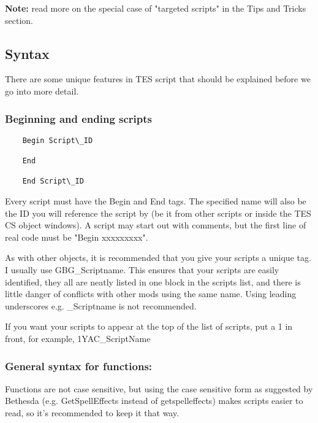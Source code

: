 \textbf{Note:} read more on the special case of "targeted scripts" in
the Tips and Tricks section.

\hypertarget{syntax}{%
\subsection{\texorpdfstring{\hfill\break
Syntax}{ Syntax}}\label{syntax}}

There are some unique features in TES script that should be explained
before we go into more detail.

\hypertarget{beginning-and-ending-scripts}{%
\subsubsection{Beginning and ending
scripts}\label{beginning-and-ending-scripts}}

\begin{lstlisting}
	Begin Script\_ID
	
	End
	
	End Script\_ID
\end{lstlisting}

Every script must have the Begin and End tags. The specified name will
also be the ID you will reference the script by (be it from other
scripts or inside the TES CS object windows). A script may start out
with comments, but the first line of real code must be "Begin
xxxxxxxxx".

As with other objects, it is recommended that you give your scripts a
unique tag. I usually use GBG\_Scriptname. This ensures that your
scripts are easily identified, they all are neatly listed in one block
in the scripts list, and there is little danger of conflicts with other
mods using the same name. Using leading underscores e.g. \_Scriptname is
not recommended.

If you want your scripts to appear at the top of the list of scripts,
put a 1 in front, for example, 1YAC\_ScriptName

\hypertarget{general-syntax-for-functions}{%
\subsubsection{\texorpdfstring{General syntax for functions:
}{General syntax for functions: }}\label{general-syntax-for-functions}}

Functions are not case sensitive, but using the case sensitive form as
suggested by Bethesda (e.g. GetSpellEffects instead of getspelleffects)
makes scripts easier to read, so it's recommended to keep it that way.

